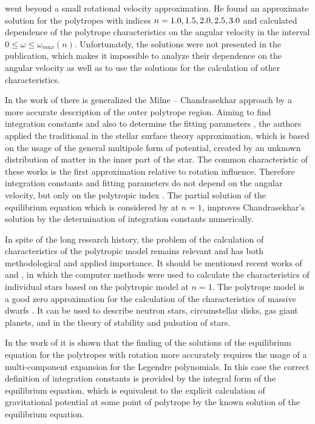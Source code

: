 \documentclass{caosp308}
\begin{document}
\citet{1964ApJ...140..552J} went beyond a small rotational velocity approximation. He found an approximate solution for the polytropes with indices $n=1.0, 1.5, 2.0,\newline 2.5, 3.0$ and calculated dependence of the polytrope characteristics on the angular velocity in the interval $0\leq\omega\leq\omega_{max}(n)$. Unfortunately, the solutions were not presented in the publication, which makes it impossible to analyze their dependence on the angular velocity as well as to use the solutions for the calculation of other characteristics.

In the work of \citet*{1965MNRAS.131...13M} there is generalized the Milne -- Chandrasekhar approach by a more accurate description of the outer polytrope region. Aiming to find integration constants \citep{1923MNRAS..83..118M,1933MNRAS..93..390C} and also to determine the fitting parameters \citep*{1965MNRAS.131...13M}, the authors applied the traditional in the stellar surface theory approximation, which is based on the usage of the general multipole form of potential, created by an unknown distribution of matter in the inner part of the star. The common characteristic of these works is the first approximation relative to rotation influence. Therefore integration constants and fitting parameters do not depend on the angular velocity, but only on the polytropic index \citep*{1923MNRAS..83..118M,1933MNRAS..93..390C,1965MNRAS.131...13M}. The partial solution of the equilibrium equation which is considered by \citet{1980Ap&SS..71..415C} at $n=1$,  improves Chandrasekhar's solution \citep{1933MNRAS..93..390C} by the determination of  integration constants numerically.

In spite of the long research history, the problem of the calculation of characteristics of the polytropic model remains relevant and has both methodological and applied importance. It should be mentioned recent works of \citet{2015MNRAS.448..456K} and \citet{2017MNRAS.467.4965K}, in which the computer methods were used to calculate the characteristics of individual stars based on the polytropic model at $n=1$. The polytrope model is a good zero approximation for the calculation of the characteristics of massive dwarfs \citep{1964ApJ...140..552J,2010JPS.14...4901V}. It can be used to describe neutron stars, circumstellar disks, gas giant planets, and in the theory of stability and pulsation of stars.

In the work of  \citet{2019MMC.6...153V} it is shown that the finding of the solutions of the equilibrium equation for the polytropes with rotation more accurately requires the usage of a multi-component expansion for the Legendre polynomials. In this case the correct definition of integration constants is provided by the integral form of the equilibrium equation, which is equivalent to the explicit calculation of gravitational potential at some point of polytrope by the known solution of the equilibrium equation.
\end{document}
